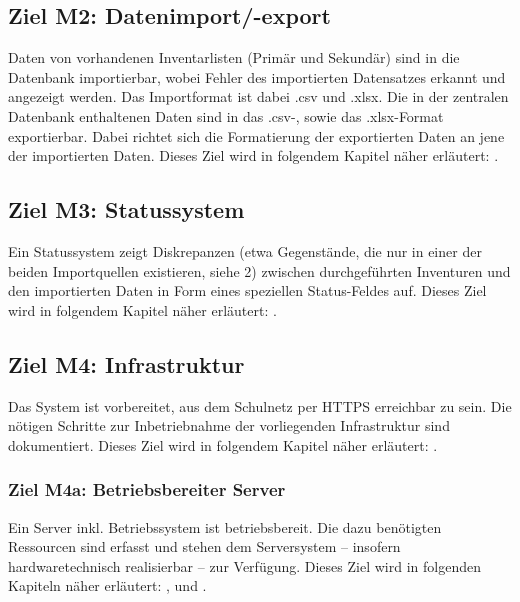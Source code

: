 \documentclass[
    headings=optiontotocandhead,%
    twoside,
    numbers=noenddot,%
    toc=flat, %
    12pt, %
    titlepage, %
    parskip=full, %
    listof=totoc, %
    listof=flat, %
    numbers=noenddot, %
    bibliography=totoc, %
    a4paper,DIV=14,
    BCOR=15mm,
]{scrbook}
\begin{document}
  \subsection*{Ziel M2: Datenimport/-export}

    Daten von vorhandenen Inventarlisten (Primär und Sekundär) sind in die Datenbank importierbar, wobei Fehler des importierten Datensatzes erkannt und angezeigt werden. Das Importformat ist dabei .csv und .xlsx. 
    Die in der zentralen Datenbank enthaltenen Daten sind in das .csv-, sowie das .xlsx-Format exportierbar. Dabei richtet sich die Formatierung der exportierten Daten an jene der importierten Daten. 
    Dieses Ziel wird in folgendem Kapitel näher erläutert: .


    \subsection*{Ziel M3: Statussystem}

    Ein Statussystem zeigt Diskrepanzen (etwa Gegenstände, die nur in einer der beiden Importquellen existieren, siehe 2) zwischen durchgeführten Inventuren und den importierten Daten in Form eines speziellen Status-Feldes auf. 
    Dieses Ziel wird in folgendem Kapitel näher erläutert: .



    \subsection*{Ziel M4: Infrastruktur}

    Das System ist vorbereitet, aus dem Schulnetz per HTTPS erreichbar zu sein. Die nötigen Schritte zur Inbetriebnahme der vorliegenden Infrastruktur sind dokumentiert. 
    Dieses Ziel wird in folgendem Kapitel näher erläutert: .
    
   
      \subsubsection*{Ziel M4a: Betriebsbereiter Server}

      Ein Server inkl. Betriebssystem ist betriebsbereit. Die dazu benötigten Ressourcen sind erfasst und stehen dem Serversystem – insofern hardwaretechnisch realisierbar – zur Verfügung.
      Dieses Ziel wird in folgenden Kapiteln näher erläutert: ,  und .
    
\end{document}
